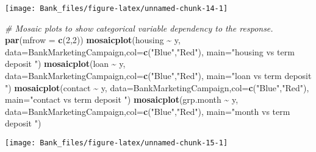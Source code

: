 \documentclass[
]{article}
\newenvironment{Shaded}{\begin{snugshade}}{\end{snugshade}}
\newcommand{\AttributeTok}[1]{\textcolor[rgb]{0.13,0.29,0.53}{#1}}
\newcommand{\CommentTok}[1]{\textcolor[rgb]{0.56,0.35,0.01}{\textit{#1}}}
\newcommand{\DecValTok}[1]{\textcolor[rgb]{0.00,0.00,0.81}{#1}}
\newcommand{\FunctionTok}[1]{\textcolor[rgb]{0.13,0.29,0.53}{\textbf{#1}}}
\newcommand{\NormalTok}[1]{#1}
\newcommand{\SpecialCharTok}[1]{\textcolor[rgb]{0.81,0.36,0.00}{\textbf{#1}}}
\newcommand{\StringTok}[1]{\textcolor[rgb]{0.31,0.60,0.02}{#1}}
\begin{document}
\begin{center}\texttt{[image: Bank\_files/figure-latex/unnamed-chunk-14-1]} \end{center}

\begin{Shaded}
\begin{Highlighting}[]
\CommentTok{\# Mosaic plots to show categorical variable dependency to the response.}
\FunctionTok{par}\NormalTok{(}\AttributeTok{mfrow =} \FunctionTok{c}\NormalTok{(}\DecValTok{2}\NormalTok{,}\DecValTok{2}\NormalTok{))}
\FunctionTok{mosaicplot}\NormalTok{(housing }\SpecialCharTok{\textasciitilde{}}\NormalTok{ y, }\AttributeTok{data=}\NormalTok{BankMarketingCampaign,}\AttributeTok{col=}\FunctionTok{c}\NormalTok{(}\StringTok{"Blue"}\NormalTok{,}\StringTok{"Red"}\NormalTok{), }\AttributeTok{main=}\StringTok{"housing vs term deposit "}\NormalTok{)}
\FunctionTok{mosaicplot}\NormalTok{(loan }\SpecialCharTok{\textasciitilde{}}\NormalTok{ y, }\AttributeTok{data=}\NormalTok{BankMarketingCampaign,}\AttributeTok{col=}\FunctionTok{c}\NormalTok{(}\StringTok{"Blue"}\NormalTok{,}\StringTok{"Red"}\NormalTok{), }\AttributeTok{main=}\StringTok{"loan vs term deposit "}\NormalTok{)}
\FunctionTok{mosaicplot}\NormalTok{(contact }\SpecialCharTok{\textasciitilde{}}\NormalTok{ y, }\AttributeTok{data=}\NormalTok{BankMarketingCampaign,}\AttributeTok{col=}\FunctionTok{c}\NormalTok{(}\StringTok{"Blue"}\NormalTok{,}\StringTok{"Red"}\NormalTok{), }\AttributeTok{main=}\StringTok{"contact vs term deposit "}\NormalTok{)}
\FunctionTok{mosaicplot}\NormalTok{(grp.month }\SpecialCharTok{\textasciitilde{}}\NormalTok{ y, }\AttributeTok{data=}\NormalTok{BankMarketingCampaign,}\AttributeTok{col=}\FunctionTok{c}\NormalTok{(}\StringTok{"Blue"}\NormalTok{,}\StringTok{"Red"}\NormalTok{), }\AttributeTok{main=}\StringTok{"month vs term deposit "}\NormalTok{)}
\end{Highlighting}
\end{Shaded}

\begin{center}\texttt{[image: Bank\_files/figure-latex/unnamed-chunk-15-1]} \end{center}
\end{document}
